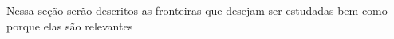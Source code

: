 Nessa seção serão descritos as fronteiras que desejam ser estudadas bem como porque elas são relevantes